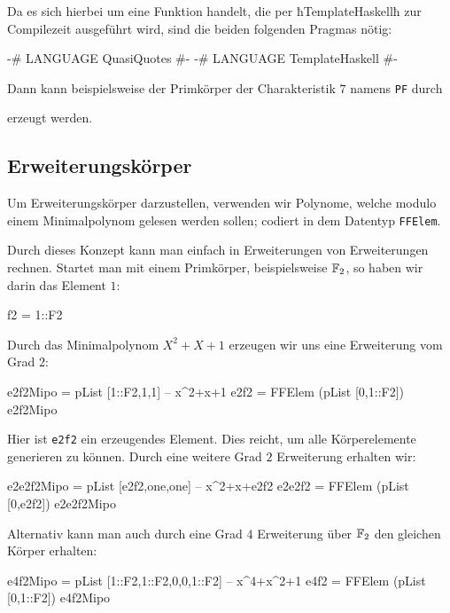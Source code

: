 Da es sich hierbei um eine Funktion handelt, die per ħTemplateHaskellħ zur
Compilezeit ausgeführt wird, sind die beiden folgenden Pragmas nötig:
\begin{hcode}
{-# LANGUAGE QuasiQuotes #-}
{-# LANGUAGE TemplateHaskell #-}
\end{hcode}
Dann kann beispielsweise der Primkörper der Charakteristik $7$ namens
\texttt{PF} durch 
erzeugt werden.

\subsection{Erweiterungskörper}
Um Erweiterungskörper darzustellen, verwenden wir Polynome, welche modulo einem
Minimalpolynom gelesen werden sollen; codiert in dem Datentyp
\texttt{FFElem}.

Durch dieses Konzept kann man einfach in Erweiterungen von Erweiterungen
rechnen.
Startet man mit einem Primkörper, beispielsweise $\mathbb{F}_2$, so haben wir
darin das Element $1$:
\begin{hcode}
f2 = 1::F2
\end{hcode}
Durch das Minimalpolynom $X^2+X+1$ erzeugen wir uns eine Erweiterung vom 
Grad 2:
\begin{hcode}
e2f2Mipo = pList [1::F2,1,1] -- x^2+x+1
e2f2 = FFElem (pList [0,1::F2]) e2f2Mipo
\end{hcode}
Hier ist \texttt{e2f2} ein erzeugendes Element. Dies reicht, 
um alle Körperelemente generieren zu können.
Durch eine weitere Grad $2$ Erweiterung erhalten wir:
\begin{hcode}
e2e2f2Mipo = pList [e2f2,one,one] -- x^2+x+e2f2
e2e2f2 = FFElem (pList [0,e2f2]) e2e2f2Mipo
\end{hcode}
Alternativ kann man auch durch eine Grad $4$ Erweiterung über $\mathbb{F}_2$ den
gleichen Körper erhalten:
\begin{hcode}
e4f2Mipo = pList [1::F2,1::F2,0,0,1::F2] -- x^4+x^2+1
e4f2 = FFElem (pList [0,1::F2]) e4f2Mipo
\end{hcode}

